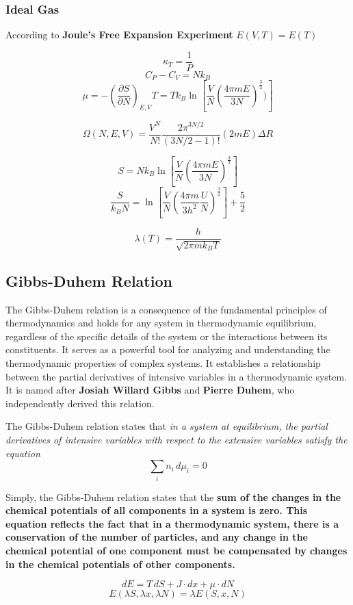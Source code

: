 \documentclass{article}
\begin{document}
\subsubsection{\large Ideal Gas}
According to \textbf{Joule's Free Expansion Experiment} $E(V, T) = E(T)$

$$\kappa_T = \frac{1}{P}$$
$$C_P - C_V = Nk_B$$
$$\mu = -\left(\frac{{\partial S}}{{\partial N}}\right)_{E,V}T=T k_B \ln[\frac{V}{N}\left(\frac{{4\pi m E}}{{3N}}\right)^{\frac{3}{2}})]$$

$$\Omega(N, E, V)
=\frac{{V^N}}{{N!}}\frac{{2\pi^{3N/2}}}{{(3N/2 - 1)!}}(2mE) \Delta R$$

$$ S=N k_B \ln[\frac{V}{N}\left(\frac{{4\pi m E}}{{3N}}\right)^{\frac{3}{2}}] $$
$$\frac{S}{k_B N} = \ln \left[ \frac{V}{N} \left( \frac{{4\pi m}}{{3h^2}} \frac{U}{N} \right)^{\frac{3}{2}} \right] + \frac{5}{2} $$


$$\lambda(T) = \frac{h}{{\sqrt{2\pi m k_B T}}}$$


\subsection{Gibbs-Duhem Relation}
The Gibbs-Duhem relation is a consequence of the fundamental principles of thermodynamics and holds for any system in thermodynamic equilibrium, regardless of the specific details of the system or the interactions between its constituents. It serves as a powerful tool for analyzing and understanding the thermodynamic properties of complex systems.
It establishes a relationship between the partial derivatives of intensive variables in a thermodynamic system. It is named after \textbf{Josiah Willard Gibbs} and \textbf{Pierre Duhem}, who independently derived this relation.

The Gibbs-Duhem relation states that \textit{in a system at equilibrium, the partial derivatives of intensive variables with respect to the extensive variables satisfy the equation}
\large
$$\sum_{i} n_{i} \, d\mu_{i}=0$$

Simply, the Gibbs-Duhem relation states that the \textbf{sum of the changes in the chemical potentials of all components in a system is zero. This equation reflects the fact that in a thermodynamic system, there is a conservation of the number of particles, and any change in the chemical potential of one component must be compensated by changes in the chemical potentials of other components.}

$$dE = T \, dS + J \cdot dx + \mu \cdot dN $$
$$E(\lambda S, \lambda x, \lambda N) = \lambda E(S, x, N)$$
\end{document}
